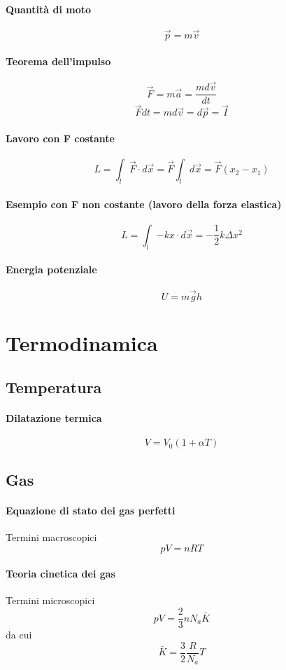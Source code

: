 \documentclass[12pt]{article}
\begin{document}
            \paragraph*{Quantità di moto}
            \[\vec{p} = m\vec{v}\]
            \paragraph*{Teorema dell'impulso}
            \[\vec{F} = m \vec{a} = \frac{md\vec{v}}{dt}\]
            \[\vec{F}dt = md\vec{v} = d\vec{p} = \vec{I}\]
            \paragraph*{Lavoro con F costante}
            \[L = \int_{l}{\vec{F} \cdot d \vec{x}} = \vec{F}\int_{l}{ d \vec{x}} = \vec{F}(x_2 - x_1)\]
            \paragraph*{Esempio con F non costante (lavoro della forza elastica)}
            \[L = \int_{l}{-k x \cdot d \vec{x}} = -\frac{1}{2}k\Delta x^2\]
            \paragraph*{Energia potenziale}
            \[U = m\vec{g}h\]
            \newpage
\section{Termodinamica}
    \subsection{Temperatura}
        \paragraph*{Dilatazione termica}
        \[V = V_0 (1 + \alpha T)\]        
    \subsection{Gas}
        \paragraph*{Equazione di stato dei gas perfetti}
        Termini macroscopici
        \[pV = nRT\]
        \paragraph*{Teoria cinetica dei gas}
        Termini microscopici
        \[pV = \frac{2}{3}n N_a \bar{K}\]
        da cui
        \[\bar{K} = \frac{3}{2}\frac{R}{N_a}T\]
\end{document}
